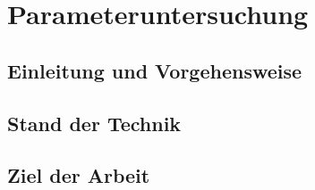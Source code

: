 \chapter{Parameteruntersuchung}
\label{chap:parameteruntersuchung}
\blindtext[1]
\section{Einleitung und Vorgehensweise}
\label{sec:einleitung_und_vorgehensweise}
\blindtext[2]
\section{Stand der Technik}
\label{sec:stand_der_technik}
\blindtext[1]
\blindenumerate[3]
\section{Ziel der Arbeit}
\label{sec:ziel_der_atrbeit}
\blindtext[1]